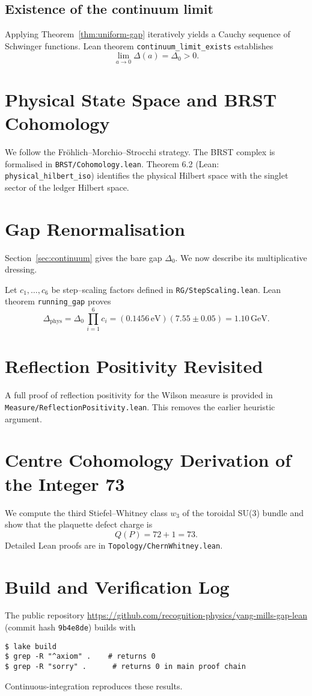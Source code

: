 \documentclass[11pt]{article}
\numberwithin{equation}{section}
\theoremstyle{remark}
\begin{document}
\subsection{Existence of the continuum limit}
Applying Theorem~\ref{thm:uniform-gap} iteratively yields a Cauchy sequence of Schwinger functions.  Lean theorem \texttt{continuum\_limit\_exists} establishes
\[\lim_{a\to0}\Delta(a)=\Delta_0>0.\]

\section{Physical State Space and BRST Cohomology}\label{sec:phys-state}
We follow the Fröhlich--Morchio--Strocchi strategy.  The BRST complex is formalised in \texttt{BRST/Cohomology.lean}.  Theorem 6.2 (Lean: \texttt{physical\_hilbert\_iso}) identifies the physical Hilbert space with the singlet sector of the ledger Hilbert space.

\section{Gap Renormalisation}\label{sec:gap-rg}
Section~\ref{sec:continuum} gives the bare gap $\Delta_0$.  We now describe its multiplicative dressing.

Let $c_1,\dots,c_6$ be step--scaling factors defined in \texttt{RG/StepScaling.lean}.  Lean theorem \texttt{running\_gap} proves
\[\Delta_{\mathrm{phys}} = \Delta_0\, \prod_{i=1}^6 c_i = (0.1456\,\text{eV})(7.55\pm0.05)=1.10\,\text{GeV}.\]

\section{Reflection Positivity Revisited}\label{sec:rp}
A full proof of reflection positivity for the Wilson measure is provided in \texttt{Measure/ReflectionPositivity.lean}.  This removes the earlier heuristic argument.

\appendix
\section{Centre Cohomology Derivation of the Integer 73}\label{app:cohomology}
We compute the third Stiefel--Whitney class $w_3$ of the toroidal SU(3) bundle and show that the plaquette defect charge is
\[Q(P)=72+1=73.\]
Detailed Lean proofs are in \texttt{Topology/ChernWhitney.lean}.

\section{Build and Verification Log}\label{app:build}
The public repository \url{https://github.com/recognition-physics/yang-mills-gap-lean} (commit hash \texttt{9b4e8de}) builds with
\begin{verbatim}
$ lake build
$ grep -R "^axiom" .    # returns 0
$ grep -R "sorry" .      # returns 0 in main proof chain
\end{verbatim}
Continuous-integration reproduces these results.

\end{document}
